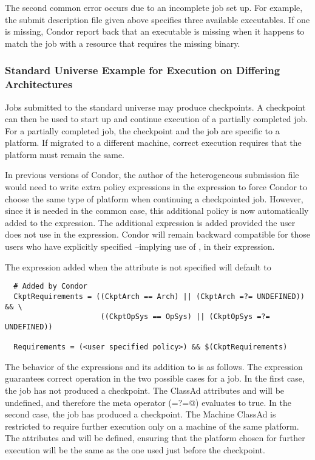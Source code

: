 The second common error occurs due to an incomplete job set up.
For example, the submit description file given above specifies
three available executables.
If one is missing, Condor report back that an
executable is missing when it happens to match the
job with a resource that requires the missing binary.

\subsubsection{Standard Universe Example for Execution on Differing Architectures} 

Jobs submitted to the standard universe may produce checkpoints.
A checkpoint can then be used to start up and continue execution
of a partially completed job.
For a partially completed job, the checkpoint and the job are specific
to a platform.
If migrated to a different machine, correct execution requires that
the platform must remain the same.

In previous versions of Condor, the author of the heterogeneous
submission file would need to write extra policy expressions in the
 expression to force Condor to choose the
same type of platform when continuing a checkpointed job.
However, since it is needed in the common case, this
additional policy is now automatically added
to the  expression.
The additional expression is added
provided the user does not use
 in the  expression.
Condor will remain backward compatible for those users who have explicitly
specified --implying use of ,
in their  expression.

The expression added when the attribute  is not specified 
will default to

\footnotesize
\begin{verbatim}
  # Added by Condor
  CkptRequirements = ((CkptArch == Arch) || (CkptArch =?= UNDEFINED)) && \
                      ((CkptOpSys == OpSys) || (CkptOpSys =?= UNDEFINED))

  Requirements = (<user specified policy>) && $(CkptRequirements)
\end{verbatim}
\normalsize

The behavior of the  expressions and its addition to
\AdAttr{requirements} is as follows.
The  expression guarantees correct operation
in the two possible cases for a job.
In the first case, the job has not produced a checkpoint.
The ClassAd attributes  and 
will be undefined, and therefore the meta operator (\verb@=?=@)
evaluates to true.
In the second case, the job has produced a checkpoint.
The Machine ClassAd is restricted to require further execution
only on a machine of the same platform.
The attributes  and 
will be defined, ensuring that the platform chosen for further
execution will be the same as the one used just before the
checkpoint.

